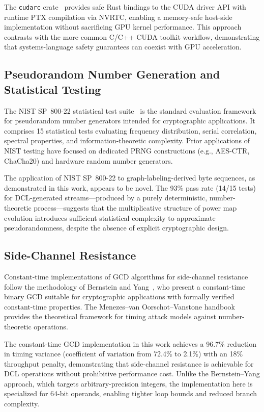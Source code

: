 \documentclass[lettersize,journal]{IEEEtran}
\begin{document}
The \texttt{cudarc} crate~\cite{cudarc2024} provides safe Rust bindings to the CUDA driver API with runtime PTX compilation via NVRTC, enabling a memory-safe host-side implementation without sacrificing GPU kernel performance. This approach contrasts with the more common C/C++ CUDA toolkit workflow, demonstrating that systems-language safety guarantees can coexist with GPU acceleration.

\subsection{Pseudorandom Number Generation and Statistical Testing}

The NIST SP~800-22 statistical test suite~\cite{nist2010} is the standard evaluation framework for pseudorandom number generators intended for cryptographic applications. It comprises 15 statistical tests evaluating frequency distribution, serial correlation, spectral properties, and information-theoretic complexity. Prior applications of NIST testing have focused on dedicated PRNG constructions (e.g., AES-CTR, ChaCha20) and hardware random number generators.

The application of NIST SP~800-22 to graph-labeling-derived byte sequences, as demonstrated in this work, appears to be novel. The 93\% pass rate (14/15 tests) for DCL-generated streams---produced by a purely deterministic, number-theoretic process---suggests that the multiplicative structure of power map evolution introduces sufficient statistical complexity to approximate pseudorandomness, despite the absence of explicit cryptographic design.

\subsection{Side-Channel Resistance}

Constant-time implementations of GCD algorithms for side-channel resistance follow the methodology of Bernstein and Yang~\cite{bernstein2019}, who present a constant-time binary GCD suitable for cryptographic applications with formally verified constant-time properties. The Menezes--van Oorschot--Vanstone handbook~\cite{menezes1997} provides the theoretical framework for timing attack models against number-theoretic operations.

The constant-time GCD implementation in this work achieves a 96.7\% reduction in timing variance (coefficient of variation from 72.4\% to 2.1\%) with an 18\% throughput penalty, demonstrating that side-channel resistance is achievable for DCL operations without prohibitive performance cost. Unlike the Bernstein--Yang approach, which targets arbitrary-precision integers, the implementation here is specialized for 64-bit operands, enabling tighter loop bounds and reduced branch complexity.
\end{document}
